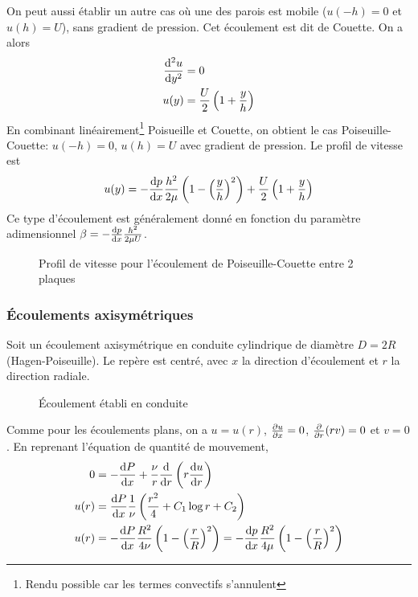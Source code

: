         On peut aussi établir un autre cas où une des parois est mobile ($u(-h) = 0$ et $u(h) = U$), sans gradient de pression. Cet écoulement est dit de Couette. On a alors
        \begin{equation}
          \begin{aligned}
            \dv[2]{u}{y} &= 0\\
            u(y) &= \frac{U}{2} \left(1 + \frac{y}{h} \right)
          \end{aligned}
        \end{equation}
        En combinant linéairement\footnote{Rendu possible car les termes convectifs s'annulent} Poisueille et Couette, on obtient le cas Poiseuille-Couette: $u(-h)=0$, $u(h)=U$ avec gradient de pression. Le profil de vitesse est
        \begin{equation}
          u(y) = -\dv{p}{x} \frac{h^2}{2\mu} \left(1-\left(\frac{y}{h}\right)^2\right) + \frac{U}{2}\left(1+\frac{y}{h}\right)
        \end{equation}
        Ce type d'écoulement est généralement donné en fonction du paramètre adimensionnel $\beta = -\dv{p}{x} \frac{h^2}{2\mu U}$.
        \begin{figure}[h]
          \centering
          
          \caption{Profil de vitesse pour l'écoulement de Poiseuille-Couette entre 2 plaques}
        \end{figure}

      \subsubsection{Écoulements axisymétriques}
        Soit un écoulement axisymétrique en conduite cylindrique de diamètre $D=2R$ (Hagen-Poiseuille).  Le repère est centré, avec $x$ la direction d'écoulement et $r$ la direction radiale.
        \begin{figure}[!h]
          \centering
          
          \caption{Écoulement établi en conduite}
          \label{fig:Hagen}
        \end{figure}
        Comme pour les écoulements plans, on a $u = u(r)$, $\pdv{u}{x} = 0$, $\pdv{r}(rv) = 0$ et $v = 0$. En reprenant l'équation de quantité de mouvement,
        \begin{equation}
          \begin{aligned}
            0 &= -\dv{P}{x} + \frac{\nu}{r} \dv{r}\left(r\dv{u}{r}\right)\\
            u(r) &= \dv{P}{x} \frac{1}{\nu} \left(\frac{r^2}{4} + C_1 \log r + C_2 \right)\\
            u(r) &= - \dv{P}{x} \frac{R^2}{4\nu} \left(1 - \left(\frac{r}{R}\right)^2\right) = - \dv{p}{x} \frac{R^2}{4\mu} \left(1 - \left(\frac{r}{R}\right)^2\right)
          \end{aligned}
        \end{equation}

